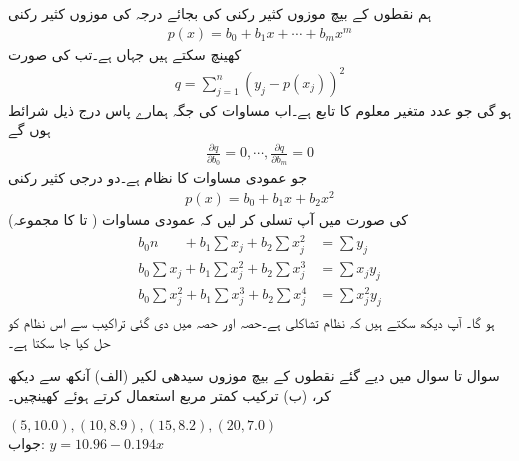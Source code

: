 ہم نقطوں کے بیچ موزوں کثیر رکنی  کی بجائے درجہ  کی موزوں کثیر رکنی
\begin{align*}
p(x)=b_0+b_1x+\cdots+b_mx^m
\end{align*}
کھینچ سکتے ہیں جہاں  ہے۔تب  کی صورت 
\begin{align*}
q=\sum_{j=1}^{n}(y_j-p(x_j))^2
\end{align*}
ہو گی جو  عدد متغیر معلوم  کا تابع ہے۔اب مساوات  کی  جگہ ہمارے پاس درج ذیل  شرائط ہوں گے
\begin{align*}
\frac{\partial q}{\partial b_0}=0,\cdots,\frac{\partial q}{\partial b_m}=0
\end{align*}
جو   عمودی مساوات کا نظام ہے۔دو درجی کثیر رکنی
\begin{align}\label{مساوات_خطی_اعدادی_کمتر_مربع_شرائط_ت}
p(x)=b_0+b_1x+b_2x^2
\end{align}
 کی صورت میں آپ تسلی کر لیں کہ عمودی مساوات ( تا  کا مجموعہ)
\begin{gather}
\begin{aligned}\label{مساوات_خطی_اعدادی_کمتر_مربع_شرائط_ٹ}
b_0 n\phantom{\sum {}_j}+b_1\sum x_j+b_2\sum x_j^2&=\sum y_j\\
b_0 \sum x_j +b_1\sum x_j^2 +b_2\sum x_j^3&=\sum x_jy_j\\
b_0 \sum x_j^2+b_1\sum x_j^3+b_2\sum x_j^4&=\sum x_j^2y_j
\end{aligned}
\end{gather}
ہو گا۔ آپ دیکھ سکتے ہیں کہ نظام تشاکلی ہے۔حصہ  اور حصہ  میں دی گئی تراکیب سے اس نظام کو حل کیا جا سکتا ہے۔


سوال  تا سوال  میں دیے گئے نقطوں کے بیچ موزوں سیدھی لکیر (الف) آنکھ سے دیکھ کر، (ب)  ترکیب کمتر مربع استعمال کرتے ہوئے  کھینچیں۔ 

\quad
$(5,10.0), (10,8.9), (15,8.2), (20,7.0)$\\
جواب:\quad
$y=10.96-0.194x$

